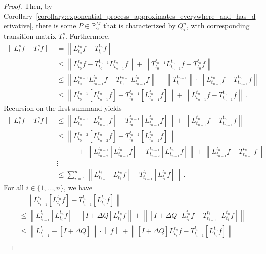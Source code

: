 \documentclass[10pt]{paper}
\newcommand{\lrate}{\underline{Q}}
\newcommand{\norm}[1]{\left\lVert #1 \right\rVert}
\begin{document}
\begin{proof}
Then, by Corollary~\ref{corollary:exponential_process_approximates_everywhere_and_has_derivative}, there is some $P\in\mathbb{P}_\mathcal{Q}^M$ that is characterized by $Q_\tau^u$, with corresponding transition matrix $T_t^s$. Furthermore,
\begin{align*}
\norm{L_t^sf - T_t^sf} &= \norm{L_{t_0}^{t_n}f - T_{t_0}^{t_n}f} \\
 &\leq \norm{L_{t_0}^{t_n}f - T_{t_0}^{t_{n-1}}L_{t_{n-1}}^{t_n}f} + \norm{T_{t_0}^{t_{n-1}}L_{t_{n-1}}^{t_n}f - T_{t_0}^{t_n}f} \\
 &\leq \norm{L_{t_0}^{t_{n-1}}L_{t_{n-1}}^{t_n}f - T_{t_0}^{t_{n-1}}L_{t_{n-1}}^{t_n}f} + \norm{{T_{t_0}^{t_{n-1}}}}\cdot\norm{L_{t_{n-1}}^{t_n}f - T_{t_{n-1}}^{t_n}f} \\
 &\leq \norm{L_{t_0}^{t_{n-1}}\left[L_{t_{n-1}}^{t_n}f\right] - T_{t_0}^{t_{n-1}}\left[L_{t_{n-1}}^{t_n}f\right]} + \norm{L_{t_{n-1}}^{t_n}f - T_{t_{n-1}}^{t_n}f} \,.
\end{align*}
Recursion on the first summand yields
\begin{align*}
\norm{L_t^sf - T_t^sf} &\leq \norm{L_{t_0}^{t_{n-1}}\left[L_{t_{n-1}}^{t_n}f\right] - T_{t_0}^{t_{n-1}}\left[L_{t_{n-1}}^{t_n}f\right]} + \norm{L_{t_{n-1}}^{t_n}f - T_{t_{n-1}}^{t_n}f} \\
 &\leq \norm{L_{t_0}^{t_{n-2}}\left[L_{t_{n-2}}^{t_n}f\right] - T_{t_0}^{t_{n-2}}\left[L_{t_{n-2}}^{t_n}f\right]} \\
 &\quad\quad\quad+ \norm{L_{t_{n-2}}^{t_{n-1}}\left[L_{t_{n-1}}^{t_n}f\right] - T_{t_{n-2}}^{t_{n-1}}\left[L_{t_{n-1}}^{t_n}f\right]} + \norm{L_{t_{n-1}}^{t_n}f - T_{t_{n-1}}^{t_n}f} \\
&\vdots \\
 &\leq \sum_{i=1}^{n} \norm{L_{t_{i-1}}^{t_i}\left[L_{t_i}^{t_n}f\right] - T_{t_{i-1}}^{t_i}\left[L_{t_i}^{t_n}f\right]}\,.
\end{align*}
For all $i\in\{1,\ldots,n\}$, we have
\begin{align*}
&\quad \norm{L_{t_{i-1}}^{t_i}\left[L_{t_i}^{t_n}f\right] - T_{t_{i-1}}^{t_i}\left[L_{t_i}^{t_n}f\right]} \\
&\leq \norm{L_{t_{i-1}}^{t_i}\left[L_{t_i}^{t_n}f\right] - \left[I+\Delta\lrate\right]L_{t_i}^{t_n}f} + \norm{\left[I+\Delta\lrate\right]L_{t_i}^{t_n}f - T_{t_{i-1}}^{t_i}\left[L_{t_i}^{t_n}f\right]} \\
&\leq \norm{L_{t_{i-1}}^{t_i} - \left[I+\Delta\lrate\right]}\cdot\norm{f} + \norm{\left[I+\Delta\lrate\right]L_{t_i}^{t_n}f - T_{t_{i-1}}^{t_i}\left[L_{t_i}^{t_n}f\right]} \\

\end{align*}
\end{proof}
\end{document}
